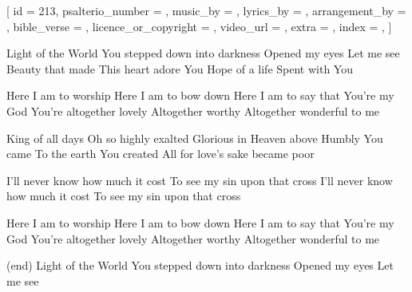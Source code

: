 
[
    id = {213},
    psalterio_number = {},
    music_by = {},
    lyrics_by = {},
    arrangement_by = {},
    bible_verse = {},
    licence_or_copyright = {},
    video_url = {},
    extra = {},
    index = {},
]


\beginverse
Light of the World
You stepped down into darkness
Opened my eyes
Let me see
Beauty that made
This heart adore You
Hope of a life
Spent with You
\endverse


\beginchorus
Here I am to worship
Here I am to bow down
Here I am to say that You're my God
You're altogether lovely
Altogether worthy
Altogether wonderful to me
\endchorus


\beginverse
King of all days
Oh so highly exalted
Glorious in Heaven above
Humbly You came
To the earth You created
All for love's sake became poor
\endverse


\beginverse*
I'll never know how much it cost
To see my sin upon that cross
I'll never know how much it cost
To see my sin upon that cross \linebreak
\endverse*


\beginchorus
Here I am to worship
Here I am to bow down
Here I am to say that You're my God
You're altogether lovely
Altogether worthy
Altogether wonderful to me
\endchorus


\beginverse*
(end)
Light of the World
You stepped down into darkness
Opened my eyes
Let me see
\endverse*


\endsong
